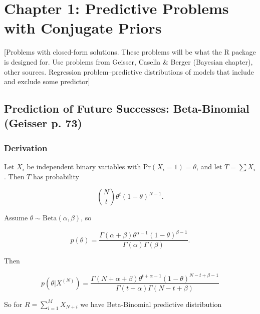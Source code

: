 \documentclass[12pt, a4paper]{article}
\begin{document}
\clearpage

\section{Chapter 1:  Predictive Problems with Conjugate Priors}

  [Problems with closed-form solutions.  These problems will be what the R package is designed for.  Use problems from Geisser, Casella \& Berger (Bayesian chapter), other sources.  Regression problem--predictive distributions of models that include and exclude some predictor]

  \subsection{Prediction of Future Successes:  Beta-Binomial (Geisser p. 73)}


    \subsubsection{Derivation}

      Let $X_i$ be independent binary variables with Pr$(X_i = 1) = \theta$, and let $T = \sum X_i$.  Then $T$ has probability

      $${N\choose t}\theta^t(1-\theta)^{N-1}.$$

      \vspace{5mm}

      Assume $\theta\sim\text{Beta}(\alpha,\beta)$, so

      \vspace{5mm}

      $$p(\theta) = \frac{\Gamma(\alpha + \beta)\theta^{\alpha - 1}(1 - \theta)^{\beta - 1}}{\Gamma(\alpha)\Gamma(\beta)}.$$

      \vspace{5mm}

      Then

      \vspace{5mm}

      $$p\left(\theta|X^{(N)}\right) = \frac{\Gamma(N+\alpha+\beta)\theta^{t+\alpha-1}(1-\theta)^{N-t+\beta-1}}{\Gamma(t+\alpha)\Gamma(N-t+\beta)}$$

      \vspace{5mm}

      \noindent So for $R = \sum_{i=1}^M X_{N+i}$ we have Beta-Binomial predictive distribution
\end{document}
